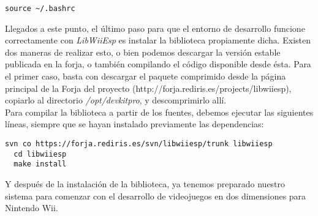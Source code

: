 \begin{lstlisting}[style=consola]
  source ~/.bashrc
\end{lstlisting}

Llegados a este punto, el último paso para que el entorno de desarrollo funcione correctamente con \emph{LibWiiEsp} es instalar la biblioteca propiamente dicha. Existen dos maneras de realizar esto, o bien podemos descargar la versión estable publicada en la forja, o también compilando el código disponible desde ésta. Para el primer caso, basta con descargar el paquete comprimido desde la página principal de la Forja del proyecto (http://forja.rediris.es/projects/libwiiesp), copiarlo al directorio \emph{/opt/devkitpro}, y descomprimirlo allí. \\

Para compilar la biblioteca a partir de los fuentes, debemos ejecutar las siguientes líneas, siempre que se hayan instalado previamente las dependencias:

\begin{lstlisting}[style=consola]
  svn co https://forja.rediris.es/svn/libwiiesp/trunk libwiiesp
  cd libwiiesp
  make install
\end{lstlisting}

Y después de la instalación de la biblioteca, ya tenemos preparado nuestro sistema para comenzar con el desarrollo de videojuegos en dos dimensiones para Nintendo Wii.

\clearpage

